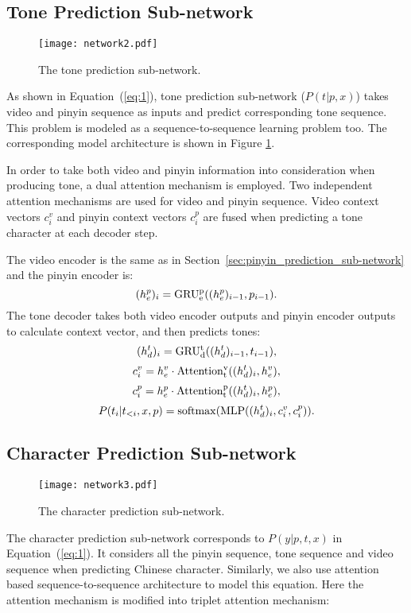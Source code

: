 \documentclass[sigconf]{acmart}
\begin{document}
\subsection{Tone Prediction Sub-network}
\begin{figure}
\centering
\texttt{[image: network2.pdf]}
\caption{The tone prediction sub-network.}\label{fig:network2}
\end{figure}
As shown in Equation~(\ref{eq:1}), tone prediction sub-network ($P(t|p, x)$) takes video and pinyin sequence as inputs and predict corresponding tone sequence. This problem is modeled as a sequence-to-sequence learning problem too. The corresponding model architecture is shown in Figure \ref{fig:network2}. 

In order to take both video and pinyin information into consideration when producing tone, a dual attention mechanism \cite{chung2017lipWild} is employed. Two independent attention mechanisms are used for video and pinyin sequence. Video context vectors $c^v_i$ and pinyin context vectors $c^p_i$ are fused when predicting a tone character at each decoder step.

The video encoder is the same as in Section~\ref{sec:pinyin_prediction_sub-network} and the pinyin encoder is:
\begin{equation}\label{eq:pinyin_encoder_input}
(h^p_e)_{i} = {\rm GRU^p_e}((h^p_e)_{i-1}, p_{i-1}).
\end{equation}
The tone decoder takes both video encoder outputs and pinyin encoder outputs to calculate context vector, and then predicts tones:
\begin{equation}
(h^t_d)_i = {\rm GRU^t_d}((h^t_d)_{i-1}, t_{i-1}),
\end{equation} 
\begin{equation}
c^v_i = h^v_e \cdot {\rm Attention^v_t}((h^t_d)_i, h^v_e),
\end{equation}
\begin{equation}
c^p_i = h^p_e \cdot {\rm Attention^p_t}((h^t_d)_i, h^p_e),
\end{equation}
\begin{equation}
P(t_i|t_{<i}, x, p) = {\rm softmax}({\rm MLP}((h^t_d)_i, c^v_i, c^p_i)).
\end{equation}

\subsection{Character Prediction Sub-network}
\begin{figure}
\centering
\texttt{[image: network3.pdf]}
\caption{The character prediction sub-network.}\label{fig:network3}
\end{figure}
The character prediction sub-network corresponds to $P(y|p, t, x)$ in Equation~(\ref{eq:1}).
It considers all the pinyin sequence, tone sequence and video sequence when predicting Chinese character. Similarly, we also use attention based sequence-to-sequence architecture to model this equation. Here the attention mechanism is modified into triplet attention mechanism:
\end{document}
